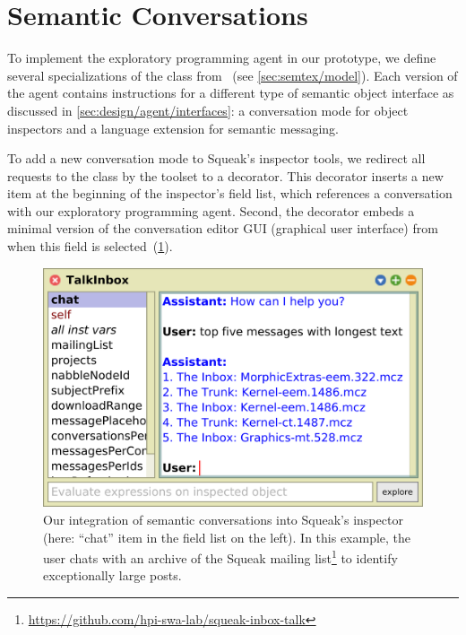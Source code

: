 
\section{Semantic Conversations}
\label{sec:implementation/conversations}

To implement the exploratory programming agent in our prototype, we define several specializations of the  class from \semtex~(see \cref{sec:semtex/model}).
Each version of the agent contains instructions for a different type of semantic object interface as discussed in \cref{sec:design/agent/interfaces}: a conversation mode for object inspectors and a language extension for semantic messaging.

To add a new conversation mode to Squeak's inspector tools, we redirect all requests to the  class by the toolset to a decorator.
This decorator inserts a new  item at the beginning of the inspector's field list, which references a conversation with our exploratory programming agent.
Second, the decorator embeds a minimal version of the conversation editor GUI (graphical user interface) from \semtex when this field is selected~(\cref{fig:implementation/conversations/inspector}).

\begin{figure}[b]
	\begin{minipage}{\textwidth}
		\centering
		\includegraphics[width=.7\textwidth]{03_conversations/inspector.png}
		\caption[Integration of semantic conversations into Squeak's inspector.]{
			Our integration of semantic conversations into Squeak's inspector (here: ``chat'' item in the field list on the left).
			In this example, the user chats with an archive of the Squeak mailing list\footnote{\url{https://github.com/hpi-swa-lab/squeak-inbox-talk}} to identify exceptionally large posts.
		}
		\label{fig:implementation/conversations/inspector}
	\end{minipage}
\end{figure}

